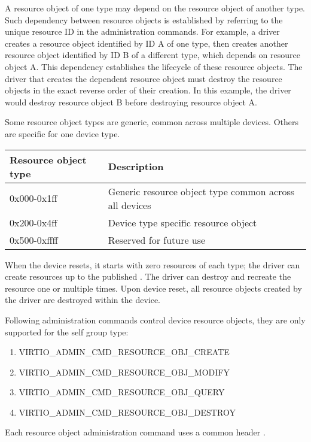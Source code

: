 A resource object of one type may depend on the resource object of another type.
Such dependency between resource objects is established by referring to the unique
resource ID in the administration commands. For example, a driver creates a
resource object identified by ID A of one type, then creates another resource
object identified by ID B of a different type, which depends on resource object
A. This dependency establishes the lifecycle of these resource objects. The driver
that creates the dependent resource object must destroy the resource objects in the
exact reverse order of their creation. In this example, the driver would
destroy resource object B before destroying resource object A.

Some resource object types are generic, common across multiple devices.
Others are specific for one device type.

\begin{tabular}{|l|l|}
\hline
Resource object type & Description \\
\hline \hline
0x000-0x1ff & Generic resource object type common across all devices \\
\hline
0x200-0x4ff & Device type specific resource object \\
\hline
0x500-0xffff & Reserved for future use  \\
\hline
\end{tabular}

When the device resets, it starts with zero resources of each type; the driver
can create resources up to the published . The driver can
destroy and recreate the resource one or multiple times. Upon device reset,
all resource objects created by the driver are destroyed within the device.

Following administration commands control device resource objects,
they are only supported for the self group type:

\begin{enumerate}
\item VIRTIO_ADMIN_CMD_RESOURCE_OBJ_CREATE
\item VIRTIO_ADMIN_CMD_RESOURCE_OBJ_MODIFY
\item VIRTIO_ADMIN_CMD_RESOURCE_OBJ_QUERY
\item VIRTIO_ADMIN_CMD_RESOURCE_OBJ_DESTROY
\end{enumerate}

Each resource object administration command uses a common header
.

